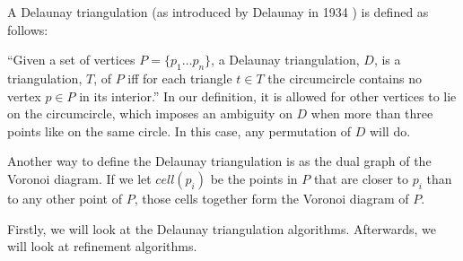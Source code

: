 A Delaunay triangulation (as introduced by Delaunay in 1934 \cite{art:Delaunay1934}) is defined as follows:

``Given a set of vertices $P = \{p_1 \ldots p_n\}$, a Delaunay triangulation, $D$, is a triangulation, $T$, of $P$
iff for each triangle $t \in T$ the circumcircle contains no vertex $p \in P$ in its interior.''
In our definition, it is allowed for other vertices to lie on the circumcircle, which imposes an ambiguity on $D$
when more than three points like on the same circle. In this case, any permutation of $D$ will do.

Another way to define the Delaunay triangulation is as the dual graph of the Voronoi diagram.
If we let $cell(p_i)$ be the points in $P$ that are closer to $p_i$ than to any other point of $P$,
those cells together form the Voronoi diagram of $P$.

Firstly, we will look at the Delaunay triangulation algorithms.
Afterwards, we will look at refinement algorithms.


